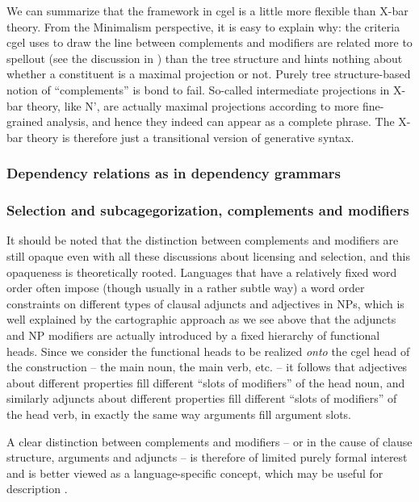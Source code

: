 \documentclass[../main.tex]{subfiles}
\begin{document}
We can summarize that the framework in \ac{cgel} is a little more flexible than X-bar theory. 
From the Minimalism perspective, it is easy to explain why: the criteria \ac{cgel} uses to draw the line 
between complements and modifiers are related more to spellout (see the discussion in )
than the tree structure and hints nothing about whether a constituent is a maximal projection or not. 
Purely tree structure-based notion of ``complements'' is bond to fail. 
So-called intermediate projections in X-bar theory, like N', are actually maximal projections according to 
more fine-grained analysis, and hence they indeed can appear as a complete phrase.
The X-bar theory is therefore just a transitional version of generative syntax.

\subsubsection{Dependency relations as in dependency grammars}\label{sec:dependency}

\subsubsection{Selection and subcagegorization, complements and modifiers}\label{sec:sub-cat}

It should be noted that the distinction between complements and modifiers are still opaque even with 
all these discussions about licensing and selection, and this opaqueness is theoretically rooted. 
Languages that have a relatively fixed word order often impose (though usually in a rather subtle way) 
a word order constraints on different types of clausal adjuncts and adjectives in NPs, 
which is well explained by the cartographic approach as we see above that the adjuncts and NP modifiers 
are actually introduced by a fixed hierarchy of functional heads. Since we consider the functional heads 
to be realized \emph{onto} the \ac{cgel} head of the construction -- the main noun, the main verb, etc. -- 
it follows that adjectives about different properties fill different ``slots of modifiers'' of the head noun, 
and similarly adjuncts about different properties fill different ``slots of modifiers'' of the head verb, 
in exactly the same way arguments fill argument slots. 

A clear distinction between complements and modifiers -- or in the cause of clause structure, arguments and
adjuncts -- is therefore of limited purely formal interest and is better viewed as a language-specific concept, 
which may be useful for description \citep{haspelmath2014arguments}. 
\end{document}
